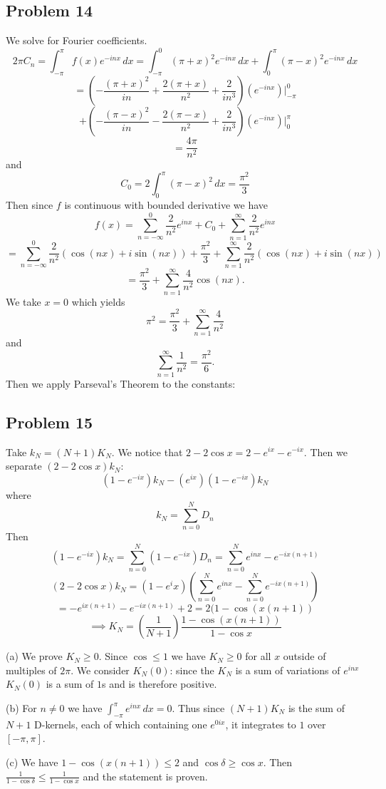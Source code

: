 \documentclass{amsart}
\begin{document}
\subsection*{Problem 14}
We solve for Fourier coefficients.
\[2\pi C_n=\int_{-\pi}^{\pi}f(x)e^{-inx}\,dx = \int_{-\pi}^0(\pi+x)^2e^{-inx}\,dx + \int_0^\pi(\pi-x)^2e^{-inx}\,dx\]
\[=\left(-\frac{(\pi+x)^2}{in}+\frac{2(\pi+x)}{n^2}+\frac{2}{in^3}\right)(e^{-inx})\Bigg|_{-\pi}^0\]
\[+\left(-\frac{(\pi-x)^2}{in}-\frac{2(\pi-x)}{n^2}+\frac{2}{in^3}\right)(e^{-inx})\Bigg|_0^\pi\]
\[=\frac{4\pi}{n^2}\]
and \[C_0=2\int_0^\pi(\pi-x)^2\,dx=\frac{\pi^2}{3}\]
Then since $f$ is continuous with bounded derivative we have 
\[f(x)=\sum_{n=-\infty}^0\frac{2}{n^2}e^{inx}+ C_0+ \sum_{n=1}^\infty\frac{2}{n^2}e^{inx}\]
\[=\sum_{n=-\infty}^0\frac{2}{n^2}(\cos(nx)+i\sin(nx))+ \frac{\pi^2}{3}+ \sum_{n=1}^\infty\frac{2}{n^2}(\cos(nx)+i\sin(nx))\]
\[=\frac{\pi^2}{3}+\sum_{n=1}^\infty\frac{4}{n^2}\cos(nx).\]
We take $x=0$ which yields \[\pi^2=\frac{\pi^2}{3}+\sum_{n=1}^\infty\frac{4}{n^2}\] and \[\sum_{n=1}^\infty\frac{1}{n^2}=\frac{\pi^2}{6}.\]
Then we apply Parseval's Theorem to the constants:

\subsection*{Problem 15}
Take $k_N = (N+1)K_N$. We notice that $2-2\cos x = 2-e^{ix}-e^{-ix}$. Then we separate $(2-2\cos x)k_N$:
\[(1-e^{-ix})k_N-(e^{ix})(1-e^{-ix})k_N\] where \[k_N=\sum_{n=0}^N D_n\]
Then \[(1-e^{-ix})k_N=\sum_{n=0}^N(1-e^{-ix})D_n=\sum_{n=0}^Ne^{inx}-e^{-ix(n+1)}\]
\[(2-2\cos x)k_N=(1-e^ix)\left(\sum_{n=0}^Ne^{inx}-\sum_{n=0}^Ne^{-ix(n+1)}\right)\]
\[=-e^{ix(n+1)}-e^{-ix(n+1)}+2=2(1-\cos(x(n+1))\]
\[\implies K_N=\left(\frac{1}{N+1}\right)\frac{1-\cos(x(n+1))}{1-\cos x}\]

\medskip \noindent (a) We prove $K_N\geq 0$. Since $\cos\leq 1$ we have $K_N\geq 0$ for all $x$ outside of multiples of $2\pi$. We consider $K_N(0)$: since the $K_N$ is a sum of variations of $e^{inx}$ $K_N(0)$ is a sum of $1$s and is therefore positive.

\medskip \noindent (b) For $n\neq 0$ we have $\int_{-\pi}^\pi e^{inx}\,dx=0$. Thus since $(N+1)K_N$ is the sum of $N+1$ D-kernels, each of which containing one $e^{0ix}$, it integrates to $1$ over $[-\pi, \pi]$. 

\medskip \noindent (c) We have $1-\cos(x(n+1))\leq 2$ and $\cos\delta\geq\cos x$. Then $\frac{1}{1-\cos\delta}\leq\frac{1}{1-\cos x}$ and the statement is proven.
\end{document}
